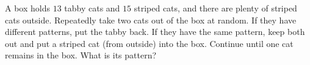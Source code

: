 A box holds $13$ tabby cats and $15$ striped cats, and there are plenty of striped cats outside. Repeatedly take two cats out of the box at random. If they have different patterns, put the tabby back. If they have the same pattern, keep both out and put a striped cat (from outside) into the box. Continue until one cat remains in the box. What is its pattern?
